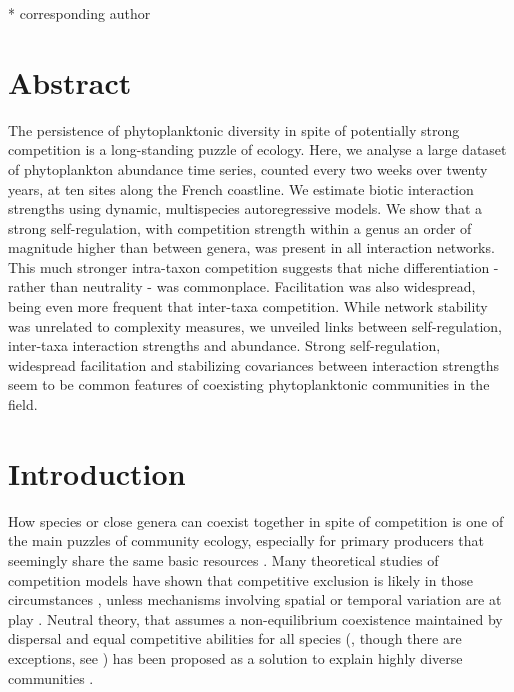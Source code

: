 \documentclass[10pt]{article}
\begin{document}
\bigskip
\vspace{200pt}
* corresponding author

\newpage
{}

\section*{Abstract}
The persistence of phytoplanktonic diversity in spite of potentially strong competition is a long-standing puzzle of ecology. Here, we analyse a large dataset of phytoplankton abundance time series, counted every two weeks over twenty years, at ten sites along the French coastline. We estimate biotic interaction strengths using dynamic, multispecies autoregressive models. We show that a strong self-regulation, with competition strength within a genus an order of magnitude higher than between genera, was present in all interaction networks. This much stronger intra-taxon competition suggests that niche differentiation - rather than neutrality - was commonplace. Facilitation was also widespread, being even more frequent that inter-taxa competition. While network stability was unrelated to complexity measures, we unveiled links between self-regulation, inter-taxa interaction strengths and abundance. Strong self-regulation, widespread facilitation and stabilizing covariances between interaction strengths seem to be common features of coexisting phytoplanktonic communities in the field.

\linenumbers

\doublespacing
\newpage
\section*{Introduction}
How species or close genera can coexist together in spite of competition
is one of the main puzzles of community ecology, especially for primary
producers that seemingly share the same basic resources \citep{hutchinson_paradox_1961}.
Many theoretical studies of competition models have shown that competitive
exclusion is likely in those circumstances \citep{armstrong1980competitive,chesson_updates_2018},
unless mechanisms involving spatial or temporal variation are at play \citep{armstrong1976coexistence,chesson_roles_1997,huisman_biological_2001,li_effects_2016}.
Neutral theory, that assumes a non-equilibrium coexistence maintained
by dispersal and equal competitive abilities for all species
(\citealt{hubbell_unified_2001}, though there are exceptions, see \citealt{volkov_neutral_2003,volkov_patterns_2007})
has been proposed as a solution to explain highly diverse communities \citep{hubbell_unified_2001,rosindell2011unified}.
\end{document}
